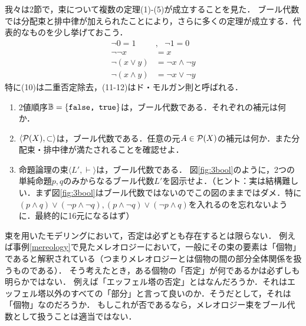 \documentclass[11pt,a4paper, dvipdfmx]{jsarticle}
\begin{document}

我々は2節で，束について複数の定理(1)-(5)が成立することを見た．
ブール代数では分配束と排中律が加えられたことにより，さらに多くの定理が成立する．代表的なものを少し挙げておこう．
\begin{align}
\neg 0 = 1 &, \ \ \ \neg 1 = 0  \\
\neg \neg x &= x \\
\neg (x \vee y) &= \neg x \wedge \neg y \\
\neg (x \wedge y) &= \neg x \vee \neg y
\end{align}
特に(10)は二重否定除去，(11-12)はド・モルガン則と呼ばれる．
 

\begin{exercise}
 \begin{enumerate}
    \item 2値順序$\mathbb{B} = \{ \texttt{false, true} \}$は，ブール代数である．それぞれの補元は何か．
    \item $\langle \mathcal{P}(X), \subset \rangle$は，ブール代数である．任意の元$A \in \mathcal{P}(X)$の補元は何か．また分配束・排中律が満たされることを確認せよ．
    \item 命題論理の束$\langle L', \vdash \rangle$は，ブール代数である．
    図\ref{fig:3bool}のように，2つの単純命題$p, q$のみからなるブール代数$L'$を図示せよ．（ヒント：実は結構難しい．まず図\ref{fig:3bool}はブール代数ではないのでこの図のままではダメ．特に$(p \wedge q)\vee(\neg p \wedge \neg q), (p \wedge \neg q)\vee(\neg p \wedge q)$を入れるのを忘れないように．最終的に16元になるはず）%
 \end{enumerate}
\end{exercise}

束を用いたモデリングにおいて，否定は必ずとも存在するとは限らない．
例えば事例\ref{mereology}で見たメレオロジーにおいて，一般にその束の要素は「個物」であると解釈されている（つまりメレオロジーとは個物の間の部分全体関係を扱うものである）．
そう考えたとき，ある個物の「否定」が何であるかは必ずしも明らかではない．
例えば「エッフェル塔の否定」とはなんだろうか．それはエッフェル塔以外のすべての「部分」と言って良いのか．そうだとして，それは「個物」なのだろうか．
もしこれが否であるなら，メレオロジー束をブール代数として扱うことは適当ではない．
\end{document}

